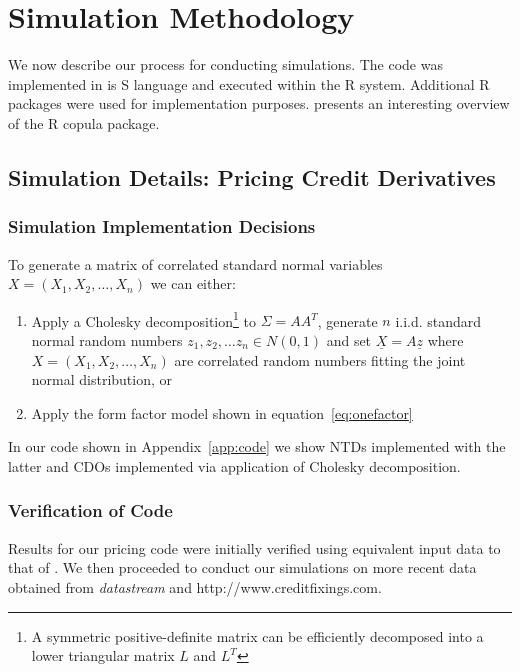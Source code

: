 \chapter{Simulation Methodology}\label{app:sim_meth}

We now describe our process for conducting simulations.  The code was implemented in is S language and executed within the R system.  
Additional R packages were used for implementation purposes. \cite{yan2007} presents an interesting overview of the R copula package.

\section{Simulation Details: Pricing Credit Derivatives}\label{sec:sim_er}

\subsection{Simulation Implementation Decisions}

To generate a matrix of correlated standard normal variables $X = (X_1, X_2, \ldots, X_n)$ we can either:
\begin{enumerate}
\item Apply a Cholesky decomposition\footnote{A symmetric positive-definite matrix can be efficiently decomposed into a lower triangular matrix $L$ and $L^T$} to $\Sigma = AA^T$, generate $n$ i.i.d. standard normal random numbers $z_1, z_2, \ldots z_n \in N(0,1)$ and set $\underline{X} = A\underline{z}$ where
$X = (X_1, X_2, \ldots, X_n)$ are correlated random numbers fitting the joint normal distribution, or
\item Apply the form factor model shown in equation~\ref{eq:onefactor}
\end{enumerate}

In our code shown in Appendix~\ref{app:code} we show NTDs implemented with the latter and CDOs implemented via application of Cholesky decomposition.

\medskip

\subsection{Verification of Code}\label{subsec:code_verif}

Results for our pricing code were initially verified using equivalent input data to that of \cite{hw2004,KL2004}.  We then proceeded to conduct our simulations on more recent data obtained from {\em datastream} and http://www.creditfixings.com.\\

